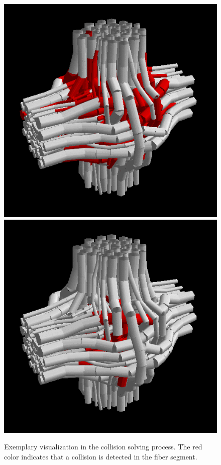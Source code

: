 \begin{figure}[!t]
    \includegraphics[width=\tikzwidth]{gfx/fastpli/solver-50}\hfill
    \includegraphics[width=\tikzwidth]{gfx/fastpli/solver-99}
	\caption{Exemplary visualization in the collision solving process. The red color indicates that a collision is detected in the fiber segment.}
	\label{fig:vis_solver}
\end{figure}
